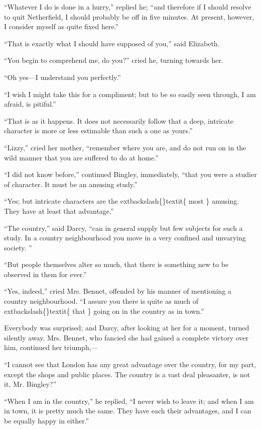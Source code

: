 \documentclass[10pt]{book}
\begin{document}
   “Whatever I do is done in a hurry,” replied he; “and therefore if I
should resolve to quit Netherfield, I should probably be off in five
minutes. At present, however, I consider myself as quite fixed here.”
  

   “That is exactly what I should have supposed of you,” said Elizabeth.
  

   “You begin to comprehend me, do you?” cried he, turning towards her.
  

   “Oh yes—I understand you perfectly.”
  

   “I wish I might take this for a compliment; but to be so easily seen
through, I am afraid, is pitiful.”
  

   “That is as it happens. It does not necessarily follow that a deep,
intricate character is more or less estimable than such a one as yours.”
  

   “Lizzy,” cried her mother, “remember where you are, and do not run on in
the wild manner that you are suffered to do at home.”
  

   “I did not know before,” continued Bingley, immediately, “that you were
a studier of character. It must be an amusing study.”
  

   “Yes; but intricate characters are the
   	extbackslash\{\}textit\{
    most
   \}
   amusing. They have at
least that advantage.”
  

   “The country,” said Darcy, “can in general supply but few subjects for
such a study. In a country neighbourhood you move in a very confined and
unvarying society.
   ”
  

   “But people themselves alter so much, that there is something new to be
observed in them for ever.”
  

   “Yes, indeed,” cried Mrs. Bennet, offended by his manner of mentioning a
country neighbourhood. “I assure you there is quite as much of
   	extbackslash\{\}textit\{
    that
   \}
   going on in the country as in town.”
  

   Everybody was surprised; and Darcy, after looking at her for a moment,
turned silently away. Mrs. Bennet, who fancied she had gained a complete
victory over him, continued her triumph,—
  

   “I cannot see that London has any great advantage over the country, for
my part, except the shops and public places. The country is a vast deal
pleasanter, is not it, Mr. Bingley?”
  

   “When I am in the country,” he replied, “I never wish to leave it; and
when I am in town, it is pretty much the same. They have each their
advantages, and I can be equally happy in either.”
  
\end{document}
